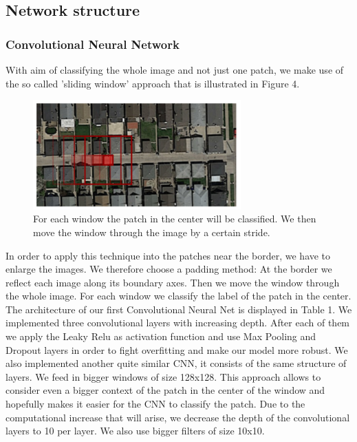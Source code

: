 \documentclass[10pt,conference,compsocconf]{IEEEtran}
\begin{document}
\subsection{Network structure}

\subsubsection{Convolutional Neural Network}
\label{cnn}

With aim of classifying the whole image and not just one patch, we make use of the so called 'sliding window' approach that is illustrated in Figure 4.


\begin{figure}[htbp]
	\centering
	\includegraphics[width=8cm]{images/slidingwindow.png}
	\caption{For each window the patch in the center will be classified. We then move the window through the image by a certain stride.}
	\vspace{-3mm}
	\label{fig:slidwindo}
\end{figure}

In order to apply this technique into the patches near the border, we have to enlarge the images. We therefore choose a padding method: At the border we reflect each image along its boundary axes. Then we move the window through the whole image. For each window we classify the label of the patch in the center. 
\\


The architecture of our first Convolutional Neural Net is displayed in Table 1. We implemented three convolutional layers with increasing depth. After each of them we apply the Leaky Relu as activation function and use Max Pooling and Dropout layers in order to fight overfitting and make our model more robust. We also implemented another quite similar CNN, it consists of the same structure of layers. We feed in bigger windows of size 128x128. This approach allows to consider even a bigger context of the patch in the center of the window and hopefully makes it easier for the CNN to classify the patch. Due to the computational increase that will arise, we decrease the depth of the convolutional layers to 10 per layer. We also use bigger filters of size 10x10.
\\
\end{document}

